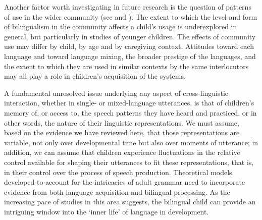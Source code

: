 \documentclass[output=paper]{langscibook}
\begin{document}
Another factor worth investigating in future research is the question of patterns of use in the wider community (see \citealt{BalamEtAl2021} and \citealt{vanOsch2023}). The extent to which the level and form of bilingualism in the community affects a child’s usage is underexplored in general, but particularly in studies of younger children. The effects of community use may differ by child, by age and by caregiving context. Attitudes toward each language and toward language mixing, the broader prestige of the languages, and the extent to which they are used in similar contexts by the same interlocutors may all play a role in children’s acquisition of the systems.

A fundamental unresolved issue underlying any aspect of cross-linguistic interaction, whether in single- or mixed-language utterances, is that of children’s memory of, or access to, the speech patterns they have heard and practiced, or in other words, the nature of their linguistic representations. We must assume, based on the evidence we have reviewed here, that those representations are variable, not only over developmental time but also over moments of utterance; in addition, we can assume that children experience fluctuations in the relative control available for shaping their utterances to fit these representations, that is, in their control over the process of speech production. Theoretical models developed to account for the intricacies of adult grammar need to incorporate evidence from both language acquisition and bilingual processing. As the increasing pace of studies in this area suggests, the bilingual child can provide an intriguing window into the ‘inner life’ of language in development. 

\sloppy\printbibliography[heading=subbibliography,notkeyword=this]
\end{document}

